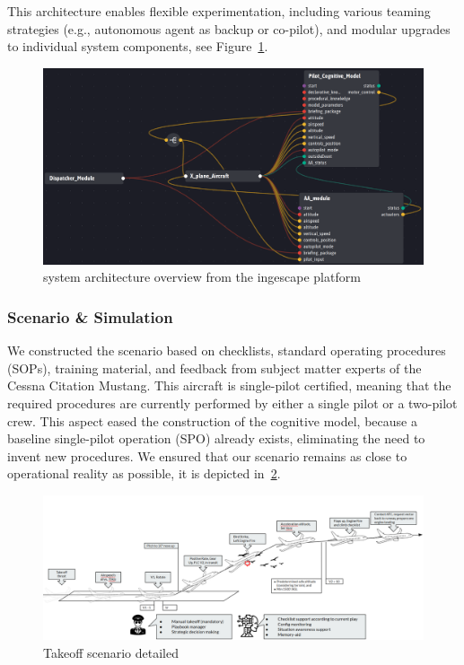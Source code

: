 \documentclass[12pt,a4paper]{article} %
\begin{document}
	This architecture enables flexible experimentation, including various teaming strategies (e.g., autonomous agent as backup or co-pilot), and modular upgrades to individual system components, see Figure~\ref{fig:ingescape_platform}.

	\begin{figure}[H] 
		\centering
		\includegraphics[width=1.0\textwidth]{./images/ingescape_platform.png}
		\caption{system architecture overview from the ingescape platform}
		\label{fig:ingescape_platform}
	\end{figure}

	\subsubsection{Scenario \& Simulation}
	We constructed the scenario based on checklists, standard operating procedures (SOPs), training material, and feedback from subject matter experts of the Cessna Citation Mustang. This aircraft is single-pilot certified, meaning that the required procedures are currently performed by either a single pilot or a two-pilot crew. This aspect eased the construction of the cognitive model, because a baseline single-pilot operation (SPO) already exists, eliminating the need to invent new procedures. We ensured that our scenario remains as close to operational reality as possible, it is depicted in~\ref{fig:scenario_detailed}.

	\begin{figure}[H]
		\centering
		\includegraphics[width=1.0\textwidth]{./images/scenario_detailed.png}
		\caption{Takeoff scenario detailed}
		\label{fig:scenario_detailed}
	\end{figure}
\end{document}

